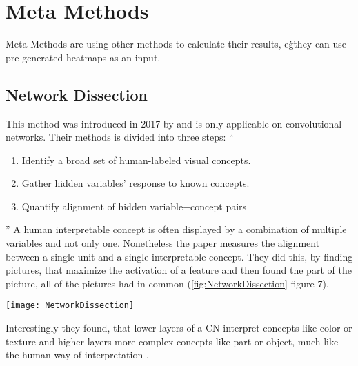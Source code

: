 \section{Meta Methods}
Meta Methods are using other methods to calculate their results, e\.g\. they can use pre generated heatmaps as an input.

\subsection{Network Dissection}
This method was introduced in 2017 by  and is only applicable on convolutional networks. Their methods is divided into three steps: 
“
\begin{enumerate}
    \item  Identify a broad set of human-labeled visual concepts. 
    \item Gather hidden variables’ response to known concepts.
    \item Quantify alignment of hidden variable−concept pairs
\end{enumerate}
” \cite[2]{Bau.2017}
A human interpretable concept is often displayed by a combination of multiple variables and not only one. Nonetheless the paper measures the alignment between a single unit and a single interpretable concept. 
They did this, by finding pictures, that maximize the activation of a feature and then found the part of the picture, all of the pictures had in common (\cref{fig:NetworkDissection} figure 7).
\begin{figure*}[h]
    \center
    \texttt{[image: NetworkDissection]}
    \caption{Network Dissection, \cite{Bau.2017}}
    \label{fig:NetworkDissection}
\end{figure*}

Interestingly they found, that lower layers of a CN interpret concepts like color or texture and higher layers more complex concepts like part or object, much like the human way of interpretation \cite{Bau.2017}.

